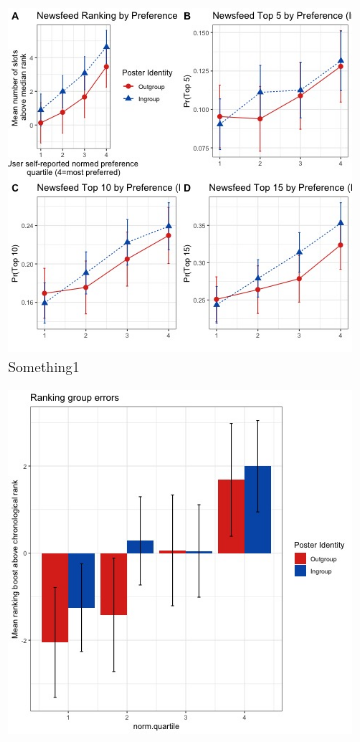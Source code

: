 \documentclass[12pt,letterpaper]{article}
\begin{document}
\begin{figure}[ht]
\caption{NF Beautiful Results}
\label{fig:nf_main_india}
    \begin{subfigure}{.5\textwidth} 
        \centering
        \includegraphics[width=1\linewidth]{Output/Graphs/Audit/Ranking line graphs/India NF all outcomes panel by norm preference by ingroup.jpg} 
        \caption{Something1}
        \label{fig:nf_line_india}
        \end{subfigure}
    \begin{subfigure}{.5\textwidth}
        \centering
        \includegraphics[width=1\linewidth]{Output/Graphs/Audit/Misranking relative to expectation/Chronological expectation/India NF by norm preference.jpg}  

\end{subfigure}
\end{figure}
\end{document}
